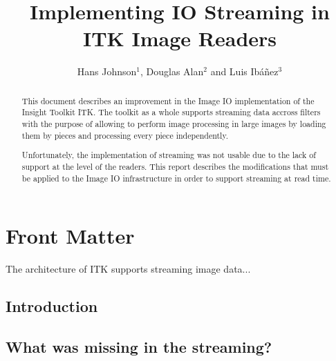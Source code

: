 \documentclass{InsightArticle}
\title{Implementing IO Streaming in ITK Image Readers}
\author{Hans Johnson$^{1}$, Douglas Alan$^{2}$ and Luis Ib\'{a}\~{n}ez$^{3}$}
\begin{document}
\ifpdf
\else
\fi


\maketitle


\ifhtml
\chapter*{Front Matter\label{front}}
\fi


\begin{abstract}
\noindent
This document describes an improvement in the Image IO implementation of the
Insight Toolkit ITK. The toolkit as a whole supports streaming data accross
filters with the purpose of allowing to perform image processing in large
images by loading them by pieces and processing every piece independently.

Unfortunately, the implementation of streaming was not usable due to the lack
of support at the level of the readers. This report describes the modifications
that must be applied to the Image IO infrastructure in order to support
streaming at read time. 
\end{abstract}

\tableofcontents

The architecture of ITK supports streaming image data...

\section{Introduction}


\section{What was missing in the streaming?}




%
%



\end{document}
